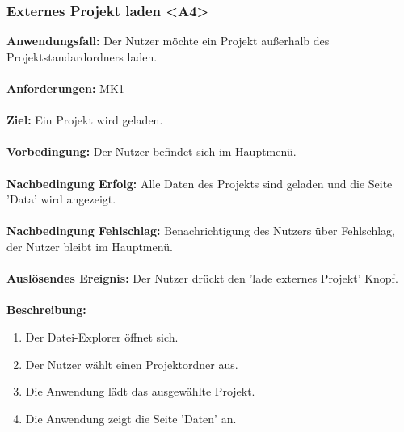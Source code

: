 \documentclass[parskip=full]{scrartcl} %
\begin{document}
\subsubsection*{Externes Projekt laden <A4>}
\textbf{Anwendungsfall:} Der Nutzer möchte ein Projekt außerhalb des Projektstandardordners laden.\\\\
\textbf{Anforderungen:} MK1\\\\
\textbf{Ziel:} Ein Projekt wird geladen. \\\\
\textbf{Vorbedingung:} Der Nutzer befindet sich im Hauptmenü.  \\\\
\textbf{Nachbedingung Erfolg:} Alle Daten des Projekts sind geladen und die Seite 'Data' wird angezeigt. \\\\
\textbf{Nachbedingung Fehlschlag:} Benachrichtigung des Nutzers über Fehlschlag, der Nutzer bleibt im Hauptmenü. \\\\
\textbf{Auslösendes Ereignis:}  Der Nutzer drückt den 'lade externes Projekt' Knopf. \\\\
\textbf{Beschreibung:}
\begin{enumerate}
    \item Der Datei-Explorer öffnet sich.
    \item Der Nutzer wählt einen Projektordner aus.
    \item Die Anwendung lädt das ausgewählte Projekt.
    \item Die Anwendung zeigt die Seite 'Daten' an.
\end{enumerate}
\newpage
\end{document}
